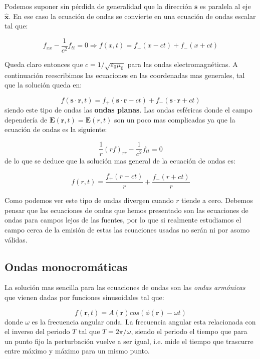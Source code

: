 \documentclass[12pt,a4paper]{article}
\newcommand{\En}{\mathbf{E}}
\newcommand{\rn}{\mathbf{r}}
\newcommand{\sn}{\mathbf{s}}
\newcommand{\hnx}{\hat{\mathbf{x}}}
\numberwithin{equation}{section}
\numberwithin{figure}{section}
\begin{document}
Podemos suponer sin pérdida de generalidad que la dirección $\sn$ es paralela al eje $\hnx$.  En ese caso la ecuación de ondas se convierte en una ecuación de ondas escalar tal que:

\begin{equation}
f_{xx} - \dfrac{1}{c^2} f_{tt} = 0 \Longrightarrow f(x,t) = f_+ (x-ct) + f_- (x+ct)
\end{equation}

Queda claro entonces que $c= 1/\sqrt{\varepsilon
_0 \mu_0}$ para las ondas electromagnéticas. A continuación reescribimos las ecuaciones en las coordenadas mas generales, tal que la solución queda en:

\begin{equation}
f(\sn \cdot \rn,t) = f_+ (\sn \cdot \rn-ct) + f_- (\sn \cdot \rn +ct)
\end{equation}
siendo este tipo de ondas las \textbf{ondas planas}. Las ondas esféricas donde el campo dependería de $\En (\rn,t) = \En (r,t)$ son un poco mas complicadas ya que la ecuación de ondas es la siguiente:

\begin{equation}
\dfrac{1}{r} (rf)_{rr} - \frac{1}{c^2} f_{tt} = 0  
\end{equation}
de lo que se deduce que la solución mas general de la ecuación de ondas es:

\begin{equation}
f(r,t) = \dfrac{f_+ (r-ct)}{r} + \dfrac{f_- (r+ct)}{r}
\end{equation}

Como podemos ver este tipo de ondas divergen cuando $r$ tiende a cero. Debemos pensar que las ecuaciones de ondas que hemos presentado son las ecuaciones de ondas para campos lejos de las fuentes, por lo que si realmente estudiamos el campo cerca de la emisión de estas las ecuaciones usadas no serán ni por asomo válidas. \\

\subsection{Ondas monocromáticas}

La solución mas sencilla para las ecuaciones de ondas son las \textit{ondas armónicas} que vienen dadas por funciones sinusoidales tal que:

\begin{equation}
f(\rn,t) =  A(\rn) cos ( \phi(\rn) - \omega t) 
\end{equation}
donde $\omega$ es la frecuencia angular onda. La frecuencia angular esta relacionada con el inverso del periodo $T$ tal que $T = 2 \pi / \omega$, siendo el periodo el tiempo que para un punto fijo la perturbación vuelve a ser igual, i.e. mide el tiempo que trascurre entre máximo y máximo para un mismo punto. \\
\end{document}
